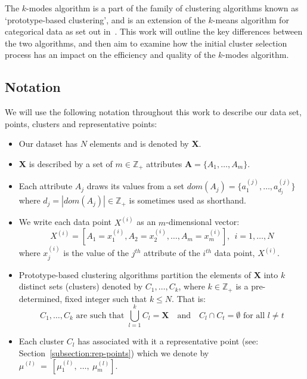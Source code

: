 The \(k\)-modes algorithm is a part of the family of clustering algorithms known 
as `prototype-based clustering', and is an extension of the \(k\)-means 
algorithm for categorical data as set out in~\cite{Huang98}. This work will 
outline the key differences between the two algorithms, and then aim to 
examine how the initial cluster selection process has an impact on the 
efficiency and quality of the \(k\)-modes algorithm.\\


\subsection{Notation}\label{subsection:notation}

We will use the following notation throughout this work to describe our data 
set, points, clusters and representative points:

\begin{itemize}
    \item Our dataset has \(N\) elements and is denoted by \textbf{X}.
    \item \textbf{X} is described by a set of \(m \in \mathbb{Z}_+\) attributes 
        \(\textbf{A} = \{A_1, \ldots, A_m\}\).
    \item Each attribute \(A_j\) draws its values from a set \(dom(A_j) = 
        \{a_1^{(j)}, \ldots, a_{d_j}^{(j)}\}\) where \(d_j = |dom(A_j)| \in 
        \mathbb{Z}_+\) is sometimes used as shorthand.
    \item We write each data point \(X^{(i)}\) as an \(m\)-dimensional vector:
	\[
		X^{(i)} = [A_1 = x_1^{(i)}, A_2 = x_2^{(i)}, \ldots, A_m = 
				x_m^{(i)}], \ \ i=1, \ldots, N
	\]
        where \(x_j^{(i)}\) is the value of the \(j^{th}\) attribute of the
        \(i^{th}\) data point, \(X^{(i)}\).
	\item Prototype-based clustering algorithms partition the elements of 
        \(\textbf{X}\) into \(k\) distinct sets (clusters) denoted by \(C_1, 
        \ldots, C_k\), where \(k \in \mathbb{Z}_+\) is a pre-determined, fixed 
        integer such that \(k \le N\). That is:
	\[
		C_1, \ldots, C_k \text{ are such that } \bigcup_{l=1}^k C_l = 
		\textbf{X} \quad \text{and} \quad C_l \cap C_t = \emptyset 
		\text{ for all } l \ne t
	\]
    \item Each cluster \(C_l\) has associated with it a representative point 
		(see: Section~\ref{subsection:rep-points}) which we denote by 
        \(\mu^{(l)}~=~[\mu_1^{(l)},~\ldots,~\mu_m^{(l)}]\).
\end{itemize}


